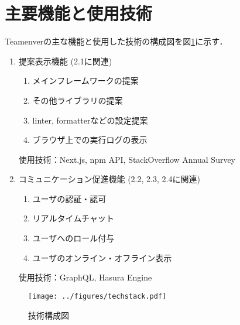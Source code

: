 \documentclass[main]{subfiles}
\begin{document}
\section{主要機能と使用技術}
Teamenverの主な機能と使用した技術の構成図を図\ref{fig:techstack}に示す．

\begin{enumerate}
\item 提案表示機能 (2.1に関連)
\begin{enumerate}
\item メインフレームワークの提案
\item その他ライブラリの提案
\item linter, formatterなどの設定提案
\item ブラウザ上での実行ログの表示
\end{enumerate}
使用技術：Next.js, npm API\cite{npm}, StackOverflow Annual Survey\cite{stackoverflow}

\item コミュニケーション促進機能 (2.2, 2.3, 2.4に関連)
\begin{enumerate}
\item ユーザの認証・認可
\item リアルタイムチャット
\item ユーザへのロール付与
\item ユーザのオンライン・オフライン表示
\end{enumerate}
使用技術：GraphQL, Hasura Engine
\end{enumerate}

\begin{figure}[h]
    \centering
    \texttt{[image: ../figures/techstack.pdf]}
    \caption{技術構成図}
    \label{fig:techstack}
\end{figure}
\end{document}
